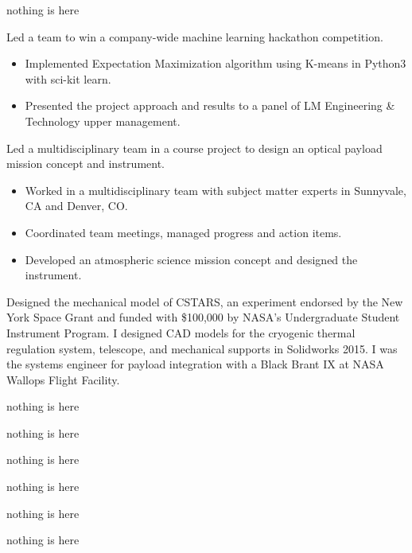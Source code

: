 \documentclass[10pt,final,sans]{resume}
\begin{document}
nothing is here

Led a team to win a company-wide machine learning hackathon competition.
\begin{itemize}
  \item Implemented Expectation Maximization algorithm using K-means in Python3 with sci-kit learn.
  \item Presented the project approach and results to a panel of LM Engineering \& Technology upper management.
\end{itemize}

Led a multidisciplinary team in a course project to design an optical payload mission concept and instrument.
\begin{itemize}
  \item Worked in a multidisciplinary team with subject matter experts in Sunnyvale, CA and Denver, CO. 
  \item Coordinated team meetings, managed progress and action items.
  \item Developed an atmospheric science mission concept and designed the instrument.
\end{itemize}

Designed the mechanical model of CSTARS, an experiment endorsed by the New York Space Grant and funded with \$100,000 by NASA's Undergraduate Student Instrument Program. I designed CAD models for the cryogenic thermal regulation system, telescope, and mechanical supports in Solidworks 2015. I was the systems engineer for payload integration with a Black Brant IX at NASA Wallops Flight Facility.

nothing is here

nothing is here

nothing is here

nothing is here

nothing is here

nothing is here
\end{document}
